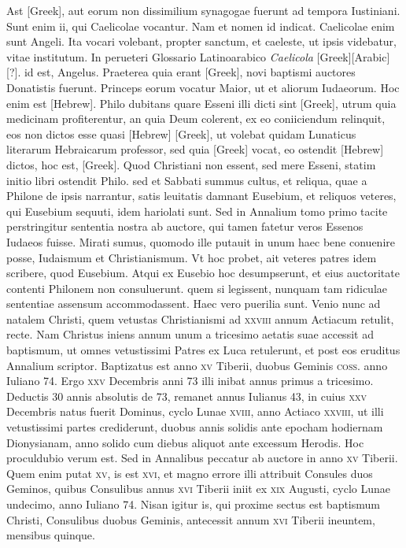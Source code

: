 \begin{parnumbers}
{}
Ast \textgreek{[Greek]}, aut eorum non dissimilium
synagogae fuerunt ad tempora Iustiniani.
\lnr{}Sunt enim ii, qui Caelicolae
vocantur.
\lnr{}Nam et nomen id indicat.
\lnr{}Caelicolae enim sunt
Angeli.
\lnr{}Ita vocari volebant, propter sanctum, et caeleste, ut ipsis videbatur,
vitae institutum.
\lnr{}In perueteri Glossario Latinoarabico \textit{Caelicola}
[Greek][Arabic][?]. id est, Angelus.
\lnr{}Praeterea quia erant \textgreek{[Greek]}, novi
baptismi auctores Donatistis fuerunt.
\lnr{}Princeps eorum vocatur
Maior, ut et aliorum Iudaeorum.
\lnr{}Hoc enim est \texthebrew{[Hebrew]}.
\lnr{}Philo dubitans
quare Esseni illi dicti sint \textgreek{[Greek]},
 utrum quia medicinam profiterentur,
\lnr{}an quia Deum colerent, ex eo coniiciendum relinquit,
eos non dictos esse quasi \texthebrew{[Hebrew]} \textgreek{[Greek]},
 ut volebat quidam Lunaticus
literarum Hebraicarum professor, sed quia \textgreek{[Greek]} vocat, eo ostendit
\texthebrew{[Hebrew]} dictos, hoc est, \textgreek{[Greek]}.
\lnr{}Quod Christiani non essent, sed
mere Esseni, statim initio libri ostendit Philo.
\lnr{}sed et Sabbati summus
cultus, et reliqua, quae a Philone de ipsis narrantur, satis leuitatis
damnant Eusebium, et reliquos veteres, qui Eusebium sequuti,
idem hariolati sunt.
\lnr{}Sed in Annalium tomo primo tacite perstringitur
sententia nostra ab auctore, qui tamen fatetur veros Essenos Iudaeos
fuisse.
\lnr{}Mirati sumus, quomodo ille putauit in unum haec bene
conuenire posse, Iudaismum et Christianismum.
\lnr{}Vt hoc probet, ait
veteres patres idem scribere, quod Eusebium.
\lnr{}Atqui ex Eusebio
hoc desumpserunt, et eius auctoritate contenti Philonem non consuluerunt.
\lnr{}quem si legissent, nunquam tam ridiculae sententiae assensum
accommodassent.
\lnr{}Haec vero puerilia sunt.
\lnr{}Venio nunc ad natalem
Christi, quem vetustas Christianismi ad \textsc{xxviii} annum Actiacum
retulit, recte.
\lnr{}Nam Christus iniens annum unum a tricesimo
aetatis suae accessit ad baptismum, ut omnes vetustissimi Patres ex
Luca retulerunt, et post eos eruditus Annalium scriptor.
\lnr{}Baptizatus est anno \textsc{xv} Tiberii, duobus Geminis \textsc{coss}. anno
Iuliano 74.
\lnr{}Ergo \textsc{xxv} Decembris anni 73 illi inibat annus primus a tricesimo.
\lnr{}Deductis 30 annis absolutis de 73, remanet annus Iulianus
43, in cuius \textsc{xxv} Decembris natus fuerit Dominus, cyclo Lunae
\textsc{xviii}, anno Actiaco \textsc{xxviii},
 ut illi vetustissimi partes crediderunt,
duobus annis solidis ante epocham hodiernam Dionysianam,
anno solido cum diebus aliquot ante excessum Herodis.
\lnr{}Hoc proculdubio
verum est.
\lnr{}Sed in Annalibus peccatur ab auctore in anno
\textsc{xv} Tiberii.
\lnr{}Quem enim putat \textsc{xv}, is est \textsc{xvi}, et magno errore illi
attribuit Consules duos Geminos, quibus Consulibus annus \textsc{xvi}
Tiberii iniit ex \textsc{xix} Augusti, cyclo Lunae undecimo, anno Iuliano
74.
\lnr{}Nisan igitur is, qui proxime sectus est baptismum Christi,
Consulibus duobus Geminis, antecessit annum \textsc{xvi} Tiberii ineuntem,
mensibus quinque.


\end{parnumbers}
